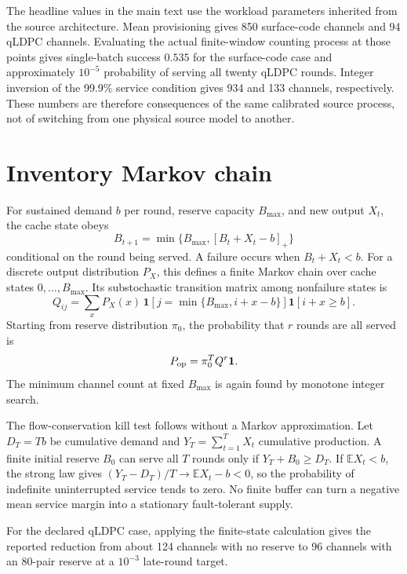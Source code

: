\documentclass[aps,prx,preprint,superscriptaddress,nofootinbib,longbibliography]{revtex4-2}
\newcommand{\E}{\mathbb E}\newcommand{\Prob}{\mathbb P}
\begin{document}
The headline values in the main text use the workload parameters inherited from the source architecture. Mean provisioning gives 850 surface-code channels and 94 qLDPC channels. Evaluating the actual finite-window counting process at those points gives single-batch success $0.535$ for the surface-code case and approximately $10^{-5}$ probability of serving all twenty qLDPC rounds. Integer inversion of the 99.9\% service condition gives 934 and 133 channels, respectively. These numbers are therefore consequences of the same calibrated source process, not of switching from one physical source model to another.

\section{Inventory Markov chain}
For sustained demand $b$ per round, reserve capacity $B_{\max}$, and new output $X_t$, the cache state obeys
\begin{equation}
 B_{t+1}=\min\{B_{\max},[B_t+X_t-b]_+\}
\end{equation}
conditional on the round being served. A failure occurs when $B_t+X_t<b$. For a discrete output distribution $P_X$, this defines a finite Markov chain over cache states $0,\ldots,B_{\max}$. Its substochastic transition matrix among nonfailure states is
\begin{equation}
 Q_{ij}=\sum_x P_X(x)\,\mathbf 1\!\left[j=\min\{B_{\max},i+x-b\}\right]\mathbf 1[i+x\ge b].
\end{equation}
Starting from reserve distribution $\pi_0$, the probability that $r$ rounds are all served is
\begin{equation}
 P_{\rm op}=\pi_0^T Q^r\mathbf 1.
\end{equation}
The minimum channel count at fixed $B_{\max}$ is again found by monotone integer search.

The flow-conservation kill test follows without a Markov approximation. Let $D_T=Tb$ be cumulative demand and $Y_T=\sum_{t=1}^{T}X_t$ cumulative production. A finite initial reserve $B_0$ can serve all $T$ rounds only if $Y_T+B_0\ge D_T$. If $\E X_t<b$, the strong law gives $(Y_T-D_T)/T\to\E X_t-b<0$, so the probability of indefinite uninterrupted service tends to zero. No finite buffer can turn a negative mean service margin into a stationary fault-tolerant supply.

For the declared qLDPC case, applying the finite-state calculation gives the reported reduction from about 124 channels with no reserve to 96 channels with an 80-pair reserve at a $10^{-3}$ late-round target.
\end{document}
